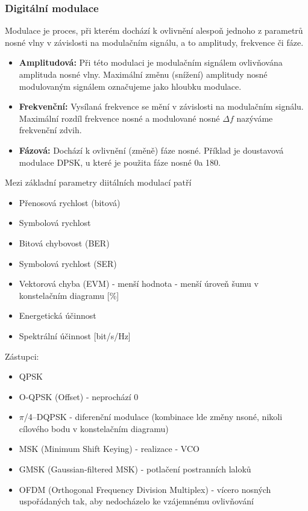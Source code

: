 		\subsubsection{Digitální modulace}
			Modulace je proces, při kterém dochází k ovlivnění alespoň jednoho z parametrů nosné vlny v závislosti na modulačním signálu, a to amplitudy, frekvence či fáze.
			\begin{itemize}
				\item \textbf{Amplitudová:} Při této modulaci je modulačním signálem ovlivňována amplituda nosné vlny. Maximální změnu (snížení) amplitudy nosné modulovaným signálem označujeme jako hloubku modulace.
				\item \textbf{Frekvenční:} Vysílaná frekvence se mění v závislosti na modulačním signálu. Maximální rozdíl frekvence nosné a modulované nosné $\Delta{f}$ nazýváme frekvenční zdvih.
				\item \textbf{Fázová:} Dochází k ovlivnění (změně) fáze nosné. Příklad je doustavová modulace DPSK, u které je použita fáze nosné 0\textdegree a 180\textdegree.
			\end{itemize}
			Mezi základní parametry diitálních modulací patří
			\begin{itemize}
				\item Přenosová rychlost (bitová)
				\item Symbolová rychlost
				\item Bitová chybovost (BER)
				\item Symbolová rychlost (SER)
				\item Vektorová chyba (EVM) - menší hodnota - menší úroveň šumu v konstelačním diagramu [\%]
				\item Energetická účinnost
				\item Spektrální účinnost [bit/s/Hz]
			\end{itemize}
			Zástupci:
			\begin{itemize}
				\item QPSK
				\item O-QPSK (Offset) - neprochází 0
				\item $\pi$/4–DQPSK - diferenční modulace (kombinace lde změny nsoné, nikoli cílového bodu v konstelačním diagramu)
				\item MSK (Minimum Shift Keying) - realizace - VCO
				\item GMSK (Gaussian-filtered MSK) - potlačení postranních laloků
				\item OFDM (Orthogonal Frequency Division Multiplex) - vícero nosných uspořádaných tak, aby nedocházelo ke vzájemnému ovlivňování
			\end{itemize}
